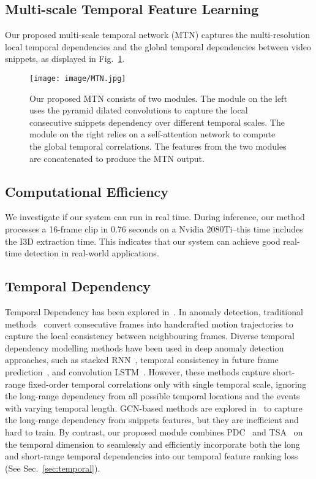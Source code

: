 \documentclass[10pt,twocolumn,letterpaper]{article}
\begin{document}
\subsection{Multi-scale Temporal Feature Learning}

Our proposed multi-scale temporal network (MTN) captures the multi-resolution local temporal dependencies and the global temporal dependencies between video snippets, as displayed in Fig.~\ref{fig:MTN}.

\begin{figure}[t!]
\begin{center}
\texttt{[image: image/MTN.jpg]}
\end{center}
  \caption{Our proposed MTN consists of two modules. The module on the left uses the pyramid dilated convolutions to capture the local consecutive snippets dependency over different temporal scales. The module on the right relies on a self-attention network to compute the global temporal correlations. The features from the two modules are concatenated to produce the MTN output.}
\label{fig:MTN}
\end{figure}


\subsection{Computational Efficiency}

We investigate if our system can run in real time. During inference, our method processes a 16-frame clip in 0.76 seconds on a Nvidia 2080Ti--this time includes the I3D extraction time. This indicates that our system can achieve good real-time detection in real-world applications. 

\subsection{Temporal Dependency}
Temporal Dependency has been explored in~\cite{liu2018future,luo2017revisit,liu2019margin,zhong2019graph,Wu2020not,kratz2009anomaly,xu2014video}. 
In anomaly detection, traditional methods~\cite{kratz2009anomaly,xu2014video} convert consecutive frames into handcrafted motion trajectories to capture the local consistency between neighbouring frames. Diverse temporal dependency modelling methods have been used in deep anomaly detection approaches, such as stacked RNN~\cite{luo2017revisit}, temporal consistency in future frame prediction~\cite{liu2018future}, and convolution LSTM~\cite{liu2019margin}.
However, these methods capture short-range fixed-order temporal correlations only with single temporal scale, ignoring the long-range dependency from all possible temporal locations and the events with varying temporal length. GCN-based methods are explored in~\cite{zhong2019graph,Wu2020not} to capture the long-range dependency from snippets features, but they are  inefficient and hard to train.
By contrast, our proposed module combines 
PDC~\cite{yu2015multi} and TSA~\cite{wang2018non} on the temporal dimension to seamlessly and efficiently incorporate both the long and short-range temporal dependencies into our temporal feature ranking loss (See Sec.~\ref{sec:temporal}). 
\end{document}
